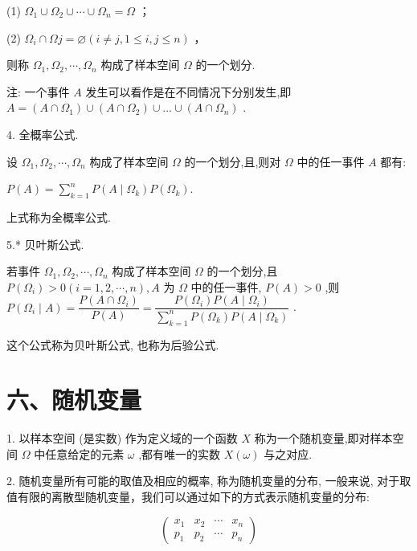 (1) ${\Omega }_{1} \cup  {\Omega }_{2} \cup  \cdots  \cup  {\Omega }_{n} = \Omega$ ；

(2) ${\Omega }_{i} \cap  {\Omega j} = \varnothing \left( {i \neq  j,1 \leq  i,j \leq  n}\right)$ ，

则称 ${\Omega }_{1},{\Omega }_{2},\cdots ,{\Omega }_{n}$ 构成了样本空间 $\Omega$ 的一个划分.

注: 一个事件 $A$ 发生可以看作是在不同情况下分别发生,即 $A = \left( {A \cap  {\Omega }_{1}}\right)  \cup  \left( {A \cap  {\Omega }_{2}}\right)  \cup  \ldots  \cup  \left( {A \cap  {\Omega }_{n}}\right)$ .

4. 全概率公式.

设 ${\Omega }_{1},{\Omega }_{2},\cdots ,{\Omega }_{n}$ 构成了样本空间 $\Omega$ 的一个划分,且,则对 $\Omega$ 中的任一事件 $A$ 都有:

$P\left( A\right)  = \mathop{\sum }\limits_{{k = 1}}^{n}P\left( {A \mid  {\Omega }_{k}}\right) P\left( {\Omega }_{k}\right) .$

上式称为全概率公式.

5.* 贝叶斯公式.

若事件 ${\Omega }_{1},{\Omega }_{2},\cdots ,{\Omega }_{n}$ 构成了样本空间 $\Omega$ 的一个划分,且 $P\left( {\Omega }_{i}\right)  > 0\left( {i = 1,2,\cdots ,n}\right) ,A$ 为 $\Omega$ 中的任一事件, $P\left( A\right)  > 0$ ,则 $P\left( {{\Omega }_{i} \mid  A}\right)  = \dfrac{P\left( {A \cap  {\Omega }_{i}}\right) }{P\left( A\right) } = \dfrac{P\left( {\Omega }_{i}\right) P\left( {A \mid  {\Omega }_{i}}\right) }{\mathop{\sum }\limits_{{k = 1}}^{n}P\left( {\Omega }_{k}\right) P\left( {A \mid  {\Omega }_{k}}\right) }$ .

这个公式称为贝叶斯公式, 也称为后验公式.

\section*{六、随机变量}

1. 以样本空间 (是实数) 作为定义域的一个函数 $X$ 称为一个随机变量,即对样本空间 $\Omega$ 中任意给定的元素 $\omega$ ,都有唯一的实数 $X\left( \omega \right)$ 与之对应.

2. 随机变量所有可能的取值及相应的概率, 称为随机变量的分布, 一般来说, 对于取值有限的离散型随机变量，我们可以通过如下的方式表示随机变量的分布:

\[
\left( \begin{array}{llll} {x}_{1} & {x}_{2} & \cdots & {x}_{n} \\  {p}_{1} & {p}_{2} & \cdots & {p}_{n} \end{array}\right)
\]

